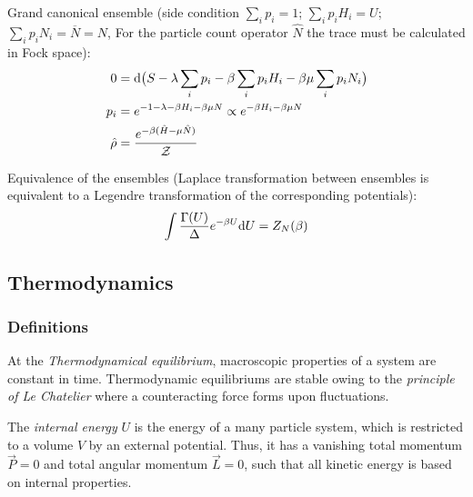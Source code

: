 			\noindent
			Grand canonical ensemble (side condition $\sum_i p_i = 1$; $\sum_i p_i H_i = U$; $\sum_i p_i N_i = \overline{N} = N$, For the particle count operator $\hat{N}$ the trace must be calculated in Fock space):
			\begin{equation}
				\begin{aligned}
					0 &= \mathrm{d} \big( S - \lambda \sum_i p_i - \beta \sum_i p_i H_i - \beta\mu \sum_i p_i N_i \big) \\
					p_i &= e^{-1-\lambda-\beta H_i-\beta\mu N} \propto e^{-\beta H_i - \beta\mu N} \\
					\hat{\rho} &= \frac{e^{-\beta (\hat{H} - \mu \hat{N})}}{\mathcal{Z}} \\
				\end{aligned}
			\end{equation}

			\noindent
			Equivalence of the ensembles (Laplace transformation between ensembles is equivalent to a Legendre transformation of the corresponding potentials):
			\begin{equation}
				\int \frac{\Gamma(U)}{\Delta} e^{-\beta U} \mathrm{d} U = Z_N(\beta)
			\end{equation}


	\subsection{Thermodynamics}
		\subsubsection{Definitions}
			At the \emph{Thermodynamical equilibrium}, macroscopic properties of a system are constant in time.
			Thermodynamic equilibriums are stable owing to the \emph{principle of Le Chatelier} where a counteracting force forms upon fluctuations.\vsp

			The \emph{internal energy} $U$ is the energy of a many particle system, which is restricted to a volume $V$ by an external potential. Thus, it has a vanishing total momentum $\vec{P}=0$ and total angular momentum $\vec{L} = 0$, such that all kinetic energy is based on internal properties. \vsp

